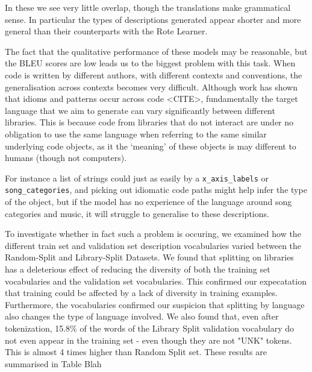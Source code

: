 In these we see very little overlap, though the translations make grammatical sense. In particular the types of descriptions generated appear shorter and more general than their counterparts with the Rote Learner.


The fact that the qualitative performance of these models may be reasonable, but the BLEU scores are low leads us to the biggest problem with this task.
When code is written by different authors, with different contexts and conventions, the generalisation across contexts becomes very difficult. 
Although work has shown that idioms and patterns occur across code <CITE>, fundamentally the target language that we aim to generate can vary significantly between different libraries.
This is because code from libraries that do not interact are under no obligation to use the same language when referring to the same similar underlying code objects, as it the `meaning' of these objects is may different to humans (though not computers). 

For instance a list of strings could just as easily by a \texttt{x_axis_labels} or \texttt{song_categories}, and picking out idiomatic code paths might help infer the type of the object, but if the model has no experience of the language around song categories and music, it will struggle to generalise to these descriptions.

To investigate whether in fact such a problem is occuring, we examined how the different train set and validation set description vocabularies varied between the Random-Split and Library-Split Datasets. 
We found that splitting on libraries has a deleterious effect of reducing the diversity of both the training set vocabularies and the validation set vocabularies. 
This confirmed our expecatation that training could be affected by a lack of diversity in training examples. 
Furthermore, the vocabularies confirmed our suspicion that splitting by language also changes the type of language involved. 
We also found that, even after tokenization, 15.8\% of the words of the Library Split validation vocabulary do not even appear in the training set - even though they are not "UNK" tokens. 
This is almost 4 times higher than Random Split set.
These results are summarised in Table Blah

